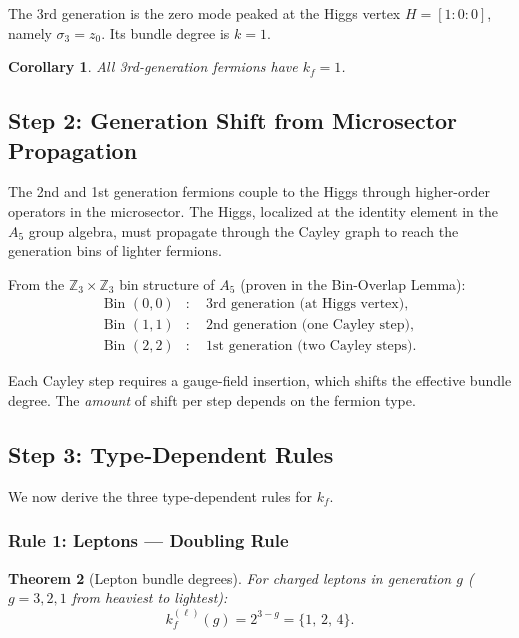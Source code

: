 \documentclass[11pt,a4paper]{article}
\newcommand{\Z}{\mathbb{Z}}
\newtheorem{theorem}{Theorem}
\newtheorem{corollary}[theorem]{Corollary}
\theoremstyle{definition}
\theoremstyle{remark}
\begin{document}
The 3rd generation is the zero mode peaked at the Higgs vertex
$H = [1:0:0]$, namely $\sigma_3 = z_0$.  Its bundle degree is $k = 1$.

\begin{corollary}
All 3rd-generation fermions have $k_f = 1$.
\end{corollary}

\subsection{Step 2: Generation Shift from Microsector Propagation}

The 2nd and 1st generation fermions couple to the Higgs through
higher-order operators in the microsector.  The Higgs, localized at the
identity element in the $A_5$ group algebra, must propagate through the
Cayley graph to reach the generation bins of lighter fermions.

From the $\Z_3 \times \Z_3$ bin structure of $A_5$ (proven in the
Bin-Overlap Lemma):
\begin{align}
\text{Bin } (0,0)&: \quad \text{3rd generation (at Higgs vertex)}, \\
\text{Bin } (1,1)&: \quad \text{2nd generation (one Cayley step)}, \\
\text{Bin } (2,2)&: \quad \text{1st generation (two Cayley steps)}.
\end{align}

Each Cayley step requires a gauge-field insertion, which shifts the
effective bundle degree.  The \emph{amount} of shift per step depends on
the fermion type.

\subsection{Step 3: Type-Dependent Rules}

We now derive the three type-dependent rules for $k_f$.

\subsubsection{Rule 1: Leptons --- Doubling Rule}

\begin{theorem}[Lepton bundle degrees]
\label{thm:lepton}
For charged leptons in generation $g$ ($g = 3, 2, 1$ from heaviest to lightest):
\begin{equation}
\boxed{k_f^{(\ell)}(g) = 2^{3-g} = \{1,\, 2,\, 4\}.}
\end{equation}
\end{theorem}
\end{document}
